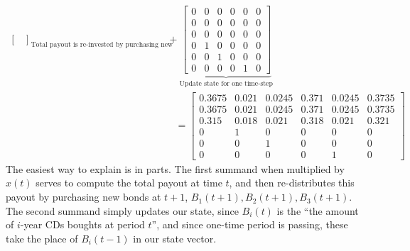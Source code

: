 \documentclass[12pt]{exam}
\begin{document}
\begin{questions}
\begin{solution}
\begin{enumerate}[label=(\alph*)]
\begin{align*}
{\begin{bmatrix}
          \end{bmatrix}}_{\text{Total payout is re-invested by purchasing new bonds}}
          + 
          \underbrace{
          \begin{bmatrix}
            0 & 0 & 0 & 0 & 0 & 0 \\
            0 & 0 & 0 & 0 & 0 & 0 \\
            0 & 0 & 0 & 0 & 0 & 0 \\
            0 & 1 & 0 & 0 & 0 & 0 \\
            0 & 0 & 1 & 0 & 0 & 0 \\
            0 & 0 & 0 & 0 & 1 & 0 
          \end{bmatrix}}_{\text{Update state for one time-step}} \\
          &= 
          \begin{bmatrix}
            0.3675 & 0.021 & 0.0245 & 0.371 & 0.0245 & 0.3735 \\
            0.3675 & 0.021 & 0.0245 & 0.371 & 0.0245 & 0.3735 \\
            0.315 & 0.018 & 0.021 & 0.318 & 0.021 & 0.321 \\
            0 & 1 & 0 & 0 & 0 & 0 \\
            0 & 0 & 1 & 0 & 0 & 0 \\
            0 & 0 & 0 & 0 & 1 & 0 
          \end{bmatrix}
      \end{align*}
      The easiest way to explain is in parts. The first summand when multiplied by $x(t)$ serves to compute the total payout at time $t$, and then re-distributes this payout by purchasing new bonds at $t+1$, $B_1(t+1), B_2(t+1), B_3(t+1)$. The second summand simply updates our state, since $B_i(t)$ is the ``the amount of $i$-year CDs boughts at period $t$'', and since one-time period is passing, these take the place of $B_i(t-1)$ in our state vector.



\end{enumerate}
\end{solution}
\end{questions}
\end{document}
